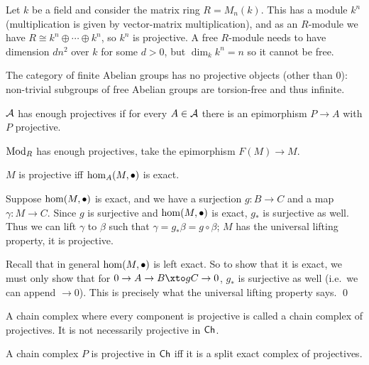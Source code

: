 \eexam

\bexam

    Let $k$ be a field and consider the matrix ring $R=M_n(k)$.
    This has a module $k^n$ (multiplication is given by vector-matrix multiplication), and as an $R$-module we have $R\cong k^n\oplus\cdots\oplus k^n$, so $k^n$ is projective.
    A free $R$-module needs to have dimension $dn^2$ over $k$ for some $d>0$, but $\dim_kk^n=n$ so it cannot be free.

\eexam

The category of finite Abelian groups has no projective objects (other than $0$): non-trivial subgroups of free Abelian groups are torsion-free and thus infinite.

\bdefn

    ${{\cal A}}$ has {\emphcolor enough projectives} if for every $A\in{{\cal A}}$ there is an epimorphism $P\to A$ with $P$ projective.

\edefn

${\rm Mod}_R$ has enough projectives, take the epimorphism $F(M)\to M$.

\blemm

    $M$ is projective iff $\hom_A(M,\bullet)$ is exact.

\elemm

\bproof

    Suppose $\hom(M,\bullet)$ is exact, and we have a surjection $g\colon B\to C$ and a map $\gamma\colon M\to C$.
    Since $g$ is surjective and $\hom(M,\bullet)$ is exact, $g_*$ is surjective as well.
    Thus we can lift $\gamma$ to $\beta$ such that $\gamma=g_*\beta=g\circ\beta$; $M$ has the universal lifting property, it is projective.

    Recall that in general $\hom(M,\bullet)$ is left exact.
    So to show that it is exact, we must only show that for $0\to A\to B\xto gC\to0$, $g_*$ is surjective as well (i.e.\ we can append $\to0$).
    This is precisely what the universal lifting property says.
    \qed

\eproof

\bdefn

    A chain complex where every component is projective is called a {\emphcolor chain complex of projectives}.
    It is not necessarily projective in ${\sf Ch}$.

\edefn

\bprop

    A chain complex $P$ is projective in ${\sf Ch}$ iff it is a split exact complex of projectives.

\eprop

